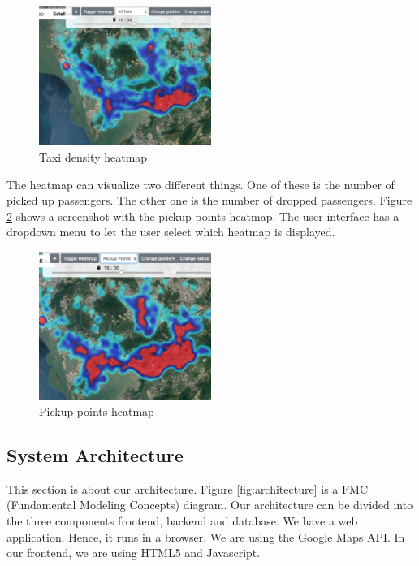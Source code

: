 \documentclass[10pt]{sig-alternate}
\begin{document}
\begin{figure}[ht]
\centering
\includegraphics[width=0.5\textwidth]{img/density.png}
\caption{Taxi density heatmap}
\label{fig:density}
\end{figure}

The heatmap can visualize two different things. One of these is the number of picked up passengers. The other one is the number of dropped passengers. Figure \ref{fig:pickup} shows a screenshot with the pickup points heatmap. The user interface has a dropdown menu to let the user select which heatmap is displayed.

\begin{figure}[ht]
\centering
\includegraphics[width=0.5\textwidth]{img/pickup.png}
\caption{Pickup points heatmap}
\label{fig:pickup}
\end{figure}

\subsection{System Architecture}

This section is about our architecture. Figure \ref{fig:architecture} is a FMC (Fundamental Modeling Concepts) diagram. Our architecture can be divided into the three components frontend, backend and database. We have a web application. Hence, it runs in a browser. We are using the Google Maps API. In our frontend, we are using HTML5 and Javascript.\\
\end{document}
